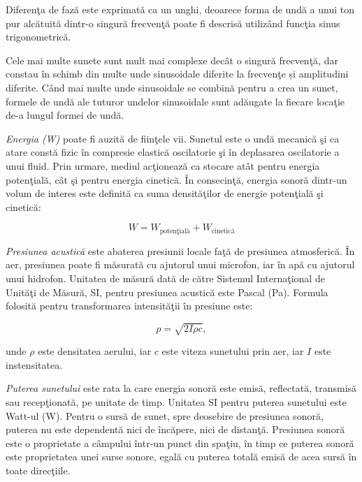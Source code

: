 	Diferen\c{t}a de faz\u{a} este exprimat\u{a} ca un unghi, deoarece forma de und\u{a} a unui ton pur alc\u{a}tuit\u{a} dintr-o singur\u{a} frecven\c{t}\u{a} poate fi descris\u{a} utiliz\^{a}nd func\c{t}ia sinus trigonometric\u{a}.	 
	
	Cele mai multe sunete sunt mult mai complexe dec\^{a}t o singur\u{a} frecven\c{t}\u{a}, dar constau \^{i}n schimb din multe unde sinusoidale diferite la frecven\c{t}e și amplitudini diferite. C\^{a}nd mai multe unde sinusoidale se combin\u{a} pentru a crea un sunet, formele de und\u{a} ale tuturor undelor sinusoidale sunt ad\u{a}ugate la fiecare loca\c{t}ie de-a lungul formei de und\u{a}.
	 	
	{\it{Energia (W)}} poate fi auzit\u{a} de fiin\c{t}ele vii. Sunetul este o und\u{a} mecanic\u{a} \c{s}i ca atare const\u{a} fizic \^{i}n compresie elastic\u{a} oscilatorie \c{s}i \^{i}n deplasarea oscilatorie a unui fluid. Prin urmare, mediul ac\c{t}ioneaz\u{a} ca stocare at\^{a}t pentru energia poten\c{t}ial\u{a}, c\^{a}t \c{s}i pentru energia cinetic\u{a}. \^{I}n consecin\c{t}\u{a}, energia sonor\u{a} dintr-un volum de interes este definit\u{a} ca suma densit\u{a}\c{t}ilor de energie poten\c{t}ial\u{a} \c{s}i cinetic\u{a}:
	
	\begin{equation}
	W = W_{\text{poten\c{t}ial\u{a}}} + W_{\text{cinetic\u{a}}}
	\end{equation}  
	
	{\it{Presiunea acustic\u{a}}} este abaterea presiunii locale fa\c{t}\u{a} de presiunea atmosferic\u{a}. \^{I}n aer, presiunea poate fi m\u{a}surat\u{a} cu ajutorul unui microfon, iar \^{i}n ap\u{a} cu ajutorul unui hidrofon. Unitatea de m\u{a}sur\u{a} dat\u{a} de c\u{a}tre Sistemul Interna\c{t}ional de Unit\u{a}\c{t}i de M\u{a}sur\u{a}, SI, pentru presiunea acustic\u{a} este Pascal (Pa). Formula folosit\u{a} pentru transformarea intensit\u{a}\c{t}ii \^{i}n presiune este:
	
	\begin{equation}
	p = \sqrt{2 I \rho c}, 
	\end{equation}
	
	\noindent unde $\rho$ este densitatea aerului, iar $c$ este viteza sunetului prin aer, iar $I$ este instensitatea.	 
	
	{\it{Puterea sunetului}} este rata la care energia sonor\u{a} este emis\u{a}, reflectat\u{a}, transmis\u{a} sau recep\c{t}ionat\u{a}, pe unitate de timp. Unitatea SI pentru puterea sunetului este Watt-ul (W). Pentru o surs\u{a} de sunet, spre deosebire de presiunea sonor\u{a}, puterea nu este dependent\u{a} nici de \^{i}nc\u{a}pere, nici de distan\c{t}\u{a}. Presiunea sonor\u{a} este o proprietate a c\^{a}mpului \^{i}ntr-un punct din spa\c{t}iu, \^{i}n timp ce puterea sonor\u{a} este proprietatea unei surse sonore, egal\u{a} cu puterea total\u{a} emis\u{a} de acea surs\u{a} \^{i}n toate direc\c{t}iile.
	 	
